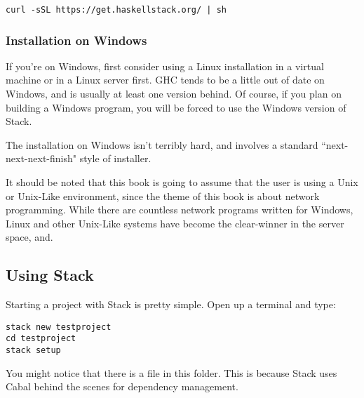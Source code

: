 \begin{verbatim}
curl -sSL https://get.haskellstack.org/ | sh
\end{verbatim}

\subsubsection{Installation on Windows}
If you're on Windows, first consider using a Linux installation in a virtual machine or in a Linux server first.  GHC tends to be a little out of date on Windows, and is usually at least one version behind. Of course, if you plan on building a Windows program, you will be forced to use the Windows version of Stack. 

The installation on Windows isn't terribly hard, and involves a standard ``next-next-next-finish" style of installer. 

It should be noted that this book is going to assume that the user is using a Unix or Unix-Like environment, since the theme of this book is about network programming.  While there are countless network programs written for Windows, Linux and other Unix-Like systems have become the clear-winner in the server space, and. 


\subsection{Using Stack}

Starting a project with Stack is pretty simple. Open up a terminal and type: 

\begin{verbatim}
stack new testproject
cd testproject
stack setup
\end{verbatim}

You might notice that there is a  file in this folder.  This is because Stack uses Cabal behind the scenes for dependency management. 
